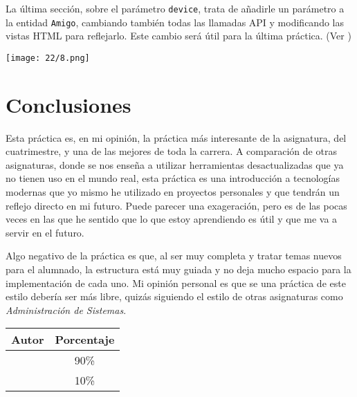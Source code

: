 La última sección, sobre el parámetro \Verb#device#, trata de añadirle un parámetro a la
entidad \Verb#Amigo#, cambiando también todas las llamadas API y modificando las vistas HTML
para reflejarlo. Este cambio será útil para la última práctica. (Ver )

\begin{minipage}{\linewidth}
	\centering
	\texttt{[image: 22/8.png]}
	\label{fig:2/21}
\end{minipage}

\section{Conclusiones}
Esta práctica es, en mi opinión, la práctica más interesante de la asignatura, del cuatrimestre,
y una de las mejores de toda la carrera. A comparación de otras asignaturas, donde se nos enseña
a utilizar herramientas desactualizadas que ya no tienen uso en el mundo real, esta práctica es
una introducción a tecnologías modernas que yo mismo he utilizado en proyectos personales y que
tendrán un reflejo directo en mi futuro. Puede parecer una exageración, pero es de las pocas veces
en las que he sentido que lo que estoy aprendiendo es útil y que me va a servir en el futuro.

Algo negativo de la práctica es que, al ser muy completa y tratar temas nuevos para el alumnado,
la estructura está muy guiada y no deja mucho espacio para la implementación de cada uno. Mi
opinión personal es que se una práctica de este estilo debería ser más libre, quizás siguiendo
el estilo de otras asignaturas como \textit{Administración de Sistemas}.

\begin{center}
	\begin{tabular}{|c|c|}
		\hline
		\textbf{Autor} & \textbf{Porcentaje} \\
		\hline
		\hline
		\authorOne & 90\% \\
		\authorTwo & 10\% \\
		\hline
	\end{tabular}
\end{center}
